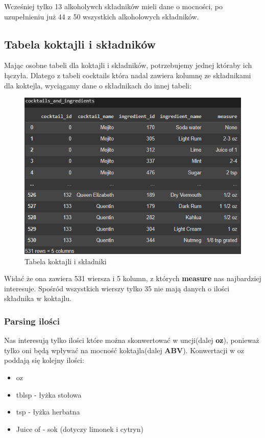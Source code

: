 \documentclass{article}
\begin{document}
Wcześniej tylko 13 alkoholywch składników mieli dane o mocności, po uzupełnieniu już 44 z 50 wszystkich alkoholowych składników.


\subsection{Tabela koktajli i składników}
Mając osobne tabeli dla koktajli i składników, potrzebujemy jednej któraby ich łączyła. Dlatego z tabeli cocktails która nadal zawiera kolumnę ze składnikami dla koktejla, wyciągamy dane o składnikach do innej tabeli:

\clearpage

\begin{figure}[htbp]
\centering
    \includegraphics[width=0.6\linewidth]{c_i_1.png}
    \caption{Tabela koktajli i składniki}
\end{figure}

Widać że ona zawiera 531 wiersza i 5 kolumn, z których \textbf{measure} nas najbardziej interesuje.
Spośród wszystkich wierszy tylko 35 nie mają danych o ilości składnika w koktajlu.

\subsubsection{Parsing ilości}

Nas interesują tylko ilości które można skonwertować w uncji(dalej \textbf{oz}), ponieważ tylko oni będą wpływać na mocność koktajla(dalej \textbf{ABV}).
Konwertacji w oz poddają się kolejny ilości:
\begin{itemize}
    \item oz
    \item tblsp - łyżka stołowa
    \item tsp - łyżka herbatna
    \item Juice of - sok (dotyczy limonek i cytryn)
\end{itemize}
\end{document}
